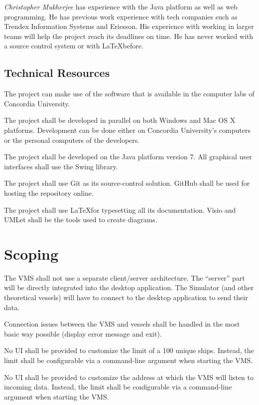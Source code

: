 \documentclass{article}
\begin{document}
\emph{Christopher Mukherjee} has experience with the Java platform as well as web programming. He has previous work experience with tech companies such as Trendex Information Systems and Ericsson. His experience with working in larger teams will help the project reach its deadlines on time. He has never worked with a source control system or with \LaTeX before.

\subsection{Technical Resources} %

The project can make use of the software that is available in the computer labs of Concordia University. 

The project shall be developed in parallel on both Windows and Mac OS X platforms. Development can be done either on Concordia University's computers or the personal computers of the developers.

The project shall be developed on the Java platform version 7. All graphical user interfaces shall use the Swing library.

The project shall use Git as its source-control solution. GitHub shall be used for hosting the repository online.

The project shall use \LaTeX for typesetting all its documentation. Visio and UMLet shall be the tools used to create diagrams.

\section{Scoping} %
The VMS shall not use a separate client/server architecture. The ``server'' part will be directly integrated into the desktop application. The Simulator (and other theoretical vessels) will have to connect to the desktop application to send their data.

Connection issues between the VMS and vessels shall be handled in the most basic way possible (display error message and exit).

No UI shall be provided to customize the limit of a 100 unique ships. Instead, the limit shall be configurable via a command-line argument when starting the VMS. 

No UI shall be provided to customize the address at which the VMS will listen to incoming data. Instead, the limit shall be configurable via a command-line argument when starting the VMS.
\end{document}
